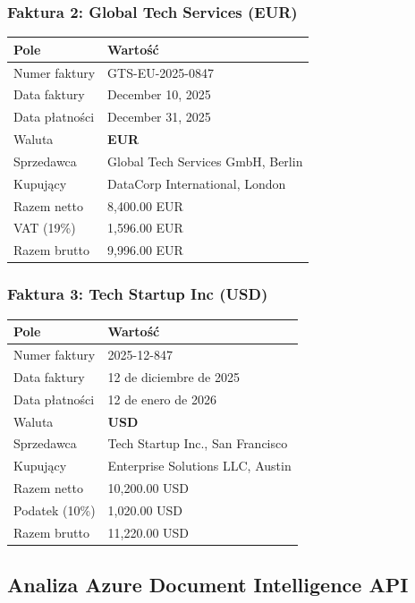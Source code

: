\subsubsection{Faktura 2: Global Tech Services (EUR)}
\begin{center}
	\begin{tabular}{|l|l|}
		\hline
		\textbf{Pole} & \textbf{Wartość} \\
		\hline
		Numer faktury & GTS-EU-2025-0847 \\
		Data faktury & December 10, 2025 \\
		Data płatności & December 31, 2025 \\
		Waluta & \textbf{EUR} \\
		Sprzedawca & Global Tech Services GmbH, Berlin \\
		Kupujący & DataCorp International, London \\
		Razem netto & 8,400.00 EUR \\
		VAT (19\%) & 1,596.00 EUR \\
		Razem brutto & 9,996.00 EUR \\
		\hline
	\end{tabular}
\end{center}

\subsubsection{Faktura 3: Tech Startup Inc (USD)}
\begin{center}
	\begin{tabular}{|l|l|}
		\hline
		\textbf{Pole} & \textbf{Wartość} \\
		\hline
		Numer faktury & 2025-12-847 \\
		Data faktury & 12 de diciembre de 2025 \\
		Data płatności & 12 de enero de 2026 \\
		Waluta & \textbf{USD} \\
		Sprzedawca & Tech Startup Inc., San Francisco \\
		Kupujący & Enterprise Solutions LLC, Austin \\
		Razem netto & 10,200.00 USD \\
		Podatek (10\%) & 1,020.00 USD \\
		Razem brutto & 11,220.00 USD \\
		\hline
	\end{tabular}
\end{center}

\subsection{Analiza Azure Document Intelligence API}

